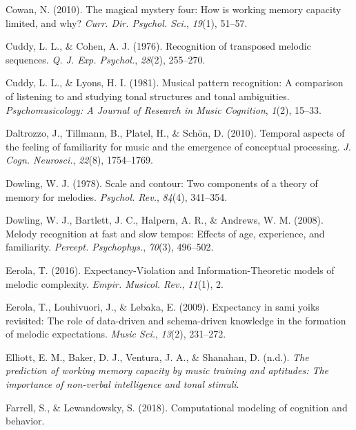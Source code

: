 \documentclass[english,man,floatsintext]{apa6}
\begin{document}
\leavevmode\hypertarget{ref-Cowan2010-zc}{}%
Cowan, N. (2010). The magical mystery four: How is working memory capacity limited, and why? \emph{Curr. Dir. Psychol. Sci.}, \emph{19}(1), 51--57.

\leavevmode\hypertarget{ref-Cuddy1976-dk}{}%
Cuddy, L. L., \& Cohen, A. J. (1976). Recognition of transposed melodic sequences. \emph{Q. J. Exp. Psychol.}, \emph{28}(2), 255--270.

\leavevmode\hypertarget{ref-Cuddy1981-ha}{}%
Cuddy, L. L., \& Lyons, H. I. (1981). Musical pattern recognition: A comparison of listening to and studying tonal structures and tonal ambiguities. \emph{Psychomusicology: A Journal of Research in Music Cognition}, \emph{1}(2), 15--33.

\leavevmode\hypertarget{ref-Daltrozzo2010-yn}{}%
Daltrozzo, J., Tillmann, B., Platel, H., \& Schön, D. (2010). Temporal aspects of the feeling of familiarity for music and the emergence of conceptual processing. \emph{J. Cogn. Neurosci.}, \emph{22}(8), 1754--1769.

\leavevmode\hypertarget{ref-Dowling1978-ql}{}%
Dowling, W. J. (1978). Scale and contour: Two components of a theory of memory for melodies. \emph{Psychol. Rev.}, \emph{84}(4), 341--354.

\leavevmode\hypertarget{ref-Dowling2008-oz}{}%
Dowling, W. J., Bartlett, J. C., Halpern, A. R., \& Andrews, W. M. (2008). Melody recognition at fast and slow tempos: Effects of age, experience, and familiarity. \emph{Percept. Psychophys.}, \emph{70}(3), 496--502.

\leavevmode\hypertarget{ref-Eerola2016-ff}{}%
Eerola, T. (2016). Expectancy-Violation and Information-Theoretic models of melodic complexity. \emph{Empir. Musicol. Rev.}, \emph{11}(1), 2.

\leavevmode\hypertarget{ref-Eerola2009-qj}{}%
Eerola, T., Louhivuori, J., \& Lebaka, E. (2009). Expectancy in sami yoiks revisited: The role of data-driven and schema-driven knowledge in the formation of melodic expectations. \emph{Music Sci.}, \emph{13}(2), 231--272.

\leavevmode\hypertarget{ref-elliott2021}{}%
Elliott, E. M., Baker, D. J., Ventura, J. A., \& Shanahan, D. (n.d.). \emph{The prediction of working memory capacity by music training and aptitudes: The importance of non-verbal intelligence and tonal stimuli}.

\leavevmode\hypertarget{ref-Farrell2018-qn}{}%
Farrell, S., \& Lewandowsky, S. (2018). Computational modeling of cognition and behavior.
\end{document}
